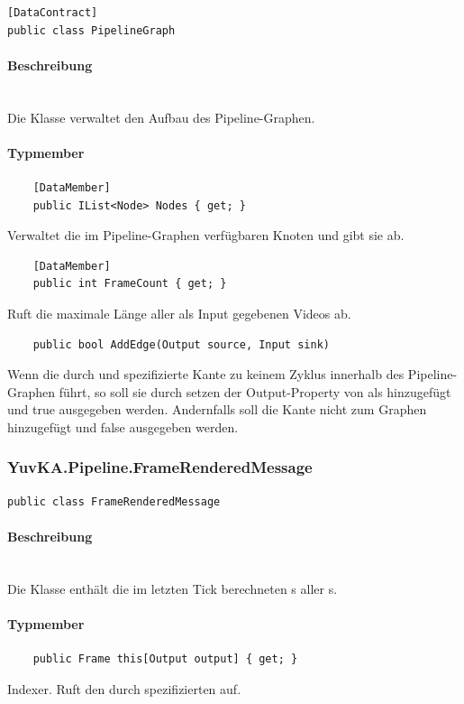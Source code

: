 \begin{verbatim}
[DataContract]
public class PipelineGraph	
\end{verbatim}

\paragraph{Beschreibung}~\\
Die Klasse  verwaltet den Aufbau des Pipeline-Graphen. 
	
\paragraph{Typmember}
\begin{itemize}

	\begin{verbatim}
	[DataMember]
	public IList<Node> Nodes { get; }
	\end{verbatim}
	Verwaltet die im Pipeline-Graphen verfügbaren Knoten und gibt sie ab.

	\begin{verbatim}
	[DataMember]
	public int FrameCount { get; }
	\end{verbatim}
	Ruft die maximale Länge aller als Input gegebenen Videos ab.


	
	\begin{verbatim}
	public bool AddEdge(Output source, Input sink)
	\end{verbatim}
	Wenn die durch  und  spezifizierte Kante zu keinem Zyklus innerhalb des Pipeline-Graphen führt, so soll sie durch setzen der Output-Property von  als  hinzugefügt und true ausgegeben werden. Andernfalls soll die Kante nicht zum Graphen hinzugefügt und false ausgegeben werden.
\end{itemize}
	
\subsubsection{YuvKA.Pipeline.FrameRenderedMessage}
		
\begin{verbatim}
public class FrameRenderedMessage
\end{verbatim}

\paragraph{Beschreibung}~\\
Die Klasse  enthält die im letzten Tick berechneten s aller s.

\paragraph{Typmember}
\begin{itemize}
	
	\begin{verbatim}
	public Frame this[Output output] { get; }
	\end{verbatim}
Indexer. Ruft den durch  spezifizierten  auf.

\end{itemize}




	


